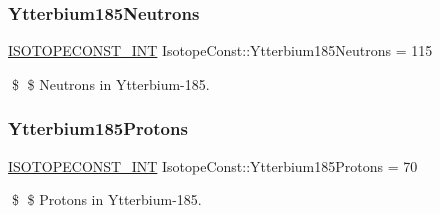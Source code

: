\subsubsection{\texorpdfstring{Ytterbium185\+Neutrons}{Ytterbium185Neutrons}}
{\footnotesize\ttfamily \mbox{\hyperlink{group___isotope_const-_macros_ga5f18360b3e99483a35c32d789e62621c}{I\+S\+O\+T\+O\+P\+E\+C\+O\+N\+S\+T\+\_\+\+I\+NT}} Isotope\+Const\+::\+Ytterbium185\+Neutrons = 115}

\$ \$ Neutrons in Ytterbium-\/185. \mbox{\label{group___isotope_const-_ytterbium-_yb185_ga44b75e1139a8a23ae4d4333cb650d319}} 
\subsubsection{\texorpdfstring{Ytterbium185\+Protons}{Ytterbium185Protons}}
{\footnotesize\ttfamily \mbox{\hyperlink{group___isotope_const-_macros_ga5f18360b3e99483a35c32d789e62621c}{I\+S\+O\+T\+O\+P\+E\+C\+O\+N\+S\+T\+\_\+\+I\+NT}} Isotope\+Const\+::\+Ytterbium185\+Protons = 70}

\$ \$ Protons in Ytterbium-\/185. 